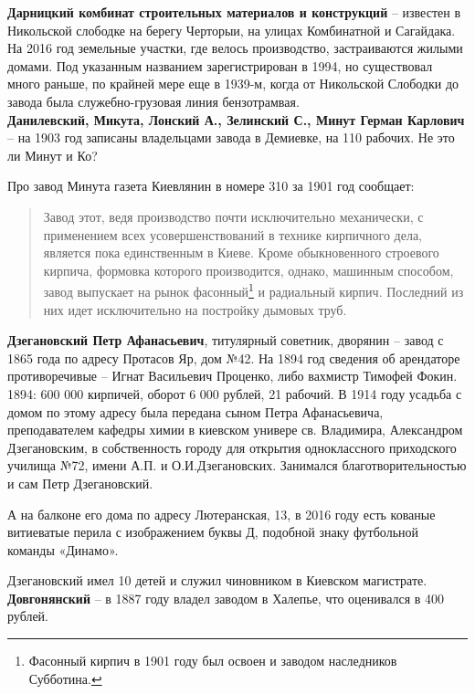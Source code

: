 \noindent\textbf{Дарницкий комбинат строительных материалов и конструкций} – известен в Никольской слободке на берегу Черторыи, на улицах Комбинатной и Сагайдака. На 2016 год земельные участки, где велось производство, застраиваются жилыми домами. Под указанным названием зарегистрирован в 1994, но существовал много раньше, по крайней мере еще в 1939-м, когда от Никольской Слободки до завода была служебно-грузовая линия бензотрамвая.\\

\noindent\textbf{Данилевский, Микута, Лонский А., Зелинский С., Минут Герман Карлович} – на 1903 год записаны владельцами завода в Демиевке, на 110 рабочих. Не это ли Минут и Ко?

Про завод Минута газета Киевлянин в номере 310 за 1901 год сообщает: 

\begin{quotation}
Завод этот, ведя производство почти исключительно механически, с применением всех усовершенствований в технике кирпичного дела, является пока единственным в Киеве. Кроме обыкновенного строевого кирпича, формовка которого производится, однако, машинным способом, завод выпускает на рынок фасонный\footnote{Фасонный кирпич в 1901 году был освоен и заводом наследников Субботина.} и радиальный кирпич. Последний из них идет исключительно на постройку дымовых труб.\end{quotation}

\noindent\textbf{Дзегановский Петр Афанасьевич}, титулярный советник, дворянин – завод с 1865 года по адресу Протасов Яр, дом №42. На 1894 год сведения об арендаторе противоречивые – Игнат Васильевич Проценко, либо вахмистр Тимофей Фокин. 1894: 600 000 кирпичей, оборот 6 000 рублей, 21 рабочий. В 1914 году усадьба с домом по этому адресу была передана сыном Петра Афанасьевича, преподавателем кафедры химии в киевском универе св. Владимира, Александром Дзегановским, в собственность городу для открытия одноклассного приходского училища №72, имени А.П. и О.И.Дзегановских. Занимался благотворительностью и сам Петр Дзегановский.

А на балконе его дома по адресу Лютеранская, 13, в 2016 году есть кованые витиеватые перила с изображением буквы Д, подобной знаку футбольной команды «Динамо».

Дзегановский имел 10 детей и служил чиновником в Киевском магистрате.\\

\noindent\textbf{Довгонянский} – в 1887 году владел заводом в Халепье, что оценивался в 400 рублей.\\

